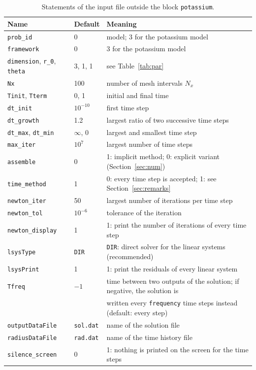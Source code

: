 \documentclass[11pt]{article}
\newcommand{\code}[1]{\texttt{#1}}
\begin{document}
\begin{table}[htb]
\centering
\small
\begin{tabular}{@{}lll@{}}
\toprule
Name & Default & Meaning \\
\midrule
\code{prob\_id} & 0 & model; 3 for the potassium model \\
\code{framework} & 0 & 3 for the potassium model \\
\code{dimension}, \code{r\_0}, \code{theta} & 3, 1, 1 & see Table~\ref{tab:par} \\
\midrule
\code{Nx} & 100 & number of mesh intervals $N_x$ \\
\code{Tinit}, \code{Tterm} & 0, 1 & initial and final time \\
\code{dt\_init} & $10^{-10}$ & first time step \\
\code{dt\_growth} & 1.2 & largest ratio of two successive time steps \\
\code{dt\_max}, \code{dt\_min} & $\infty$, 0 & largest and smallest time step \\
\code{max\_iter} & $10^7$ & largest number of time steps \\
\midrule
\code{assemble} & 0 & 1: implicit method; 0: explicit variant (Section~\ref{sec:num}) \\
\code{time\_method} & 1 & 0: every time step is accepted; 1: see Section~\ref{sec:remarks} \\
\code{newton\_iter} & 50 & largest number of iterations per time step \\
\code{newton\_tol} & $10^{-6}$ & tolerance of the iteration \\
\code{newton\_display} & 1 & 1: print the number of iterations of every time step \\
\code{lsysType} & \code{DIR} & \code{DIR}: direct solver for the linear systems (recommended) \\
\code{lsysPrint} & 1 & 1: print the residuals of every linear system \\
\midrule
\code{Tfreq} & $-1$ & time between two outputs of the solution; if negative, the solution is \\
 & & written every \code{frequency} time steps instead (default: every step) \\
\code{outputDataFile} & \code{sol.dat} & name of the solution file \\
\code{radiusDataFile} & \code{rad.dat} & name of the time history file \\
\code{silence\_screen} & 0 & 1: nothing is printed on the screen for the time steps \\
\bottomrule
\end{tabular}
\caption{Statements of the input file outside the block \code{potassium}.}
\label{tab:keys}
\end{table}
\end{document}
